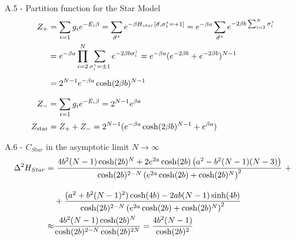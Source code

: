 \documentclass{article}
\begin{document}
A.5 - Partition function for the Star Model
\begin{align}
    Z_+
    &=\sum_{i=1}g_ie^{-E_i\beta}=\sum_{\vec{\sigma}^z}e^{-\beta H_{star}[\vec{\sigma},\sigma_1^z=+1]}=e^{-\beta a}\sum_{\vec{\sigma}^z}e^{-2\beta b \sum_{i=2}^N \sigma_i^z}\notag \\\notag 
    &=e^{-\beta a}\prod_{i=2}^N\sum_{\sigma_i^z=\pm1}e^{-2\beta b\sigma_i^z}=e^{-\beta a}(e^{-2\beta b}+e^{-2\beta b})^{N-1} \\[5pt] \notag 
    &= 2^{N-1}e^{-\beta a}\cosh(2\beta b)^{N-1}\\[7pt]\notag
    Z_-
    &=\sum_{i=1}g_ie^{-E_i\beta}=2^{N-1}e^{\beta a}\\[2pt]
    Z_{\text{star}}
    &=Z_+ + Z_-=2^{N-1}(e^{-\beta a}\cosh(2\beta b )^{N-1}+e^{\beta a}) 
    \label{Z_star_A}
\end{align}

A.6 - $C_{Star}$ in the asymptotic limit $N\to\infty$
\begin{align}
    \Delta^2H_{Star} =&\,\,\frac{4b^2 (N-1) \cosh(2b)^N + 2e^{2a} \cosh(2b) \left( a^2 - b^2 (N-1)(N-3)\right)}{\cosh(2b)^{2-N} \left( e^{2a} \cosh(2b) + \cosh(2b)^N \right)^2}\,\,+\notag\\[10pt]
   &+ \frac{(a^2 + b^2 (N-1)^2) \cosh(4b) - 2ab(N-1) \sinh(4b)}{\cosh(2b)^{2-N} \left( e^{2a} \cosh(2b) + \cosh(2b)^N \right)^2} \label{A6} \\ \notag
   \approx&\frac{4b^2(N-1)\cosh(2b)^N}{\cosh(2b)^{2-N}\cosh(2b)^{2N}} = \frac{4b^2(N-1)}{\cosh(2b)^{2}}
\end{align}
\end{document}
